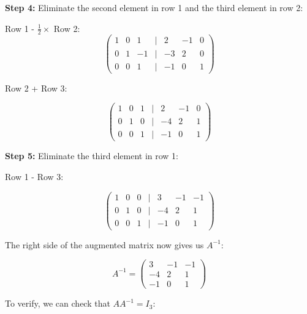 \textbf{Step 4:} Eliminate the second element in row 1 and the third element in row 2:

Row 1 - \(\frac{1}{2} \times\) Row 2:
\[
    \begin{pmatrix}
    1 & 0 & 1 & | & 2 & -1 & 0 \\
    0 & 1 & -1 & | & -3 & 2 & 0 \\
    0 & 0 & 1 & | & -1 & 0 & 1
    \end{pmatrix}
\]

Row 2 + Row 3:

\[
    \begin{pmatrix}
    1 & 0 & 1 & | & 2 & -1 & 0 \\
    0 & 1 & 0 & | & -4 & 2 & 1 \\
    0 & 0 & 1 & | & -1 & 0 & 1
    \end{pmatrix}
\]

\textbf{Step 5:} Eliminate the third element in row 1:

Row 1 - Row 3:

\[
    \begin{pmatrix}
    1 & 0 & 0 & | & 3 & -1 & -1 \\
    0 & 1 & 0 & | & -4 & 2 & 1 \\
    0 & 0 & 1 & | & -1 & 0 & 1
    \end{pmatrix}
\]

The right side of the augmented matrix now gives us \(A^{-1}\):

\[
    A^{-1} = 
    \begin{pmatrix}
    3 & -1 & -1 \\
    -4 & 2 & 1 \\
    -1 & 0 & 1
    \end{pmatrix}
\]

To verify, we can check that \(AA^{-1} = I_3\):

